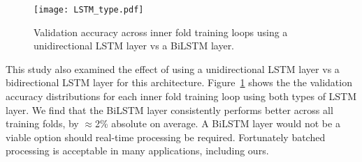 \documentclass{article}
\begin{document}
\begin{figure}\begin{minipage}[b]{1.0\linewidth}
  \centering
  \centerline{\texttt{[image: LSTM\_type.pdf]}}
\end{minipage}
\vspace{-6mm}
\caption{Validation accuracy across inner fold training loops using a unidirectional LSTM layer vs a BiLSTM layer.}
\label{fig:lstm}
\vspace{-3mm}
\end{figure}

This study also examined the effect of using a unidirectional LSTM layer vs a bidirectional LSTM layer for this architecture.
\mbox{Figure \ref{fig:lstm}} shows the the validation accuracy distributions for each inner fold training loop using both types of LSTM layer.
We find that the BiLSTM layer consistently performs better across all training folds, by $\approx$2\% absolute on average.
A BiLSTM layer would not be a viable option should real-time processing be required.
Fortunately batched processing is acceptable in many applications, including ours.

\begin{table}
\caption{Comparison of best and compact outer fold VADs.}
    \label{tab:param_selection}
\end{table}
\end{document}
